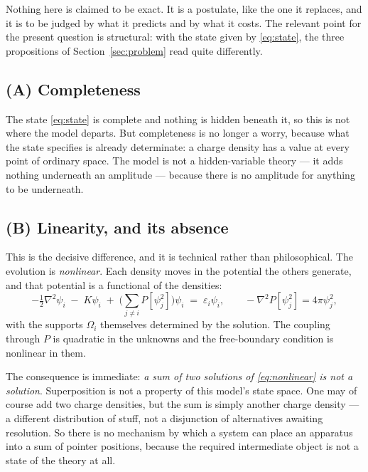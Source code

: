 \documentclass[11pt]{article}
\begin{document}
Nothing here is claimed to be exact. It is a postulate, like the one it replaces, and it is to be
judged by what it predicts and by what it costs. The relevant point for the present question is
structural: with the state given by \eqref{eq:state}, the three propositions of
Section~\ref{sec:problem} read quite differently.

\subsection*{(A) Completeness}

The state \eqref{eq:state} is complete and nothing is hidden beneath it, so this is not where the
model departs. But completeness is no longer a worry, because what the state specifies is already
determinate: a charge density has a value at every point of ordinary space. The model is not a
hidden-variable theory --- it adds nothing underneath an amplitude --- because there is no
amplitude for anything to be underneath.

\subsection*{(B) Linearity, and its absence}

This is the decisive difference, and it is technical rather than philosophical. The evolution is
\emph{nonlinear}. Each density moves in the potential the others generate, and that potential is a
functional of the densities:
\begin{equation}
-\tfrac12\nabla^2\psi_i \;-\; K\psi_i \;+\; \Big(\textstyle\sum_{j \neq i} P[\psi_j^2]\Big)\psi_i
\;=\; \varepsilon_i \psi_i ,
\qquad -\nabla^2 P[\psi_j^2] = 4\pi \psi_j^2 ,
\label{eq:nonlinear}
\end{equation}
with the supports $\Omega_i$ themselves determined by the solution. The coupling through $P$ is
quadratic in the unknowns and the free-boundary condition is nonlinear in them.

The consequence is immediate: \emph{a sum of two solutions of \eqref{eq:nonlinear} is not a
solution}. Superposition is not a property of this model's state space. One may of course add two
charge densities, but the sum is simply another charge density --- a different distribution of
stuff, not a disjunction of alternatives awaiting resolution. So there is no mechanism by which a
system can place an apparatus into a sum of pointer positions, because the required intermediate
object is not a state of the theory at all.
\end{document}
